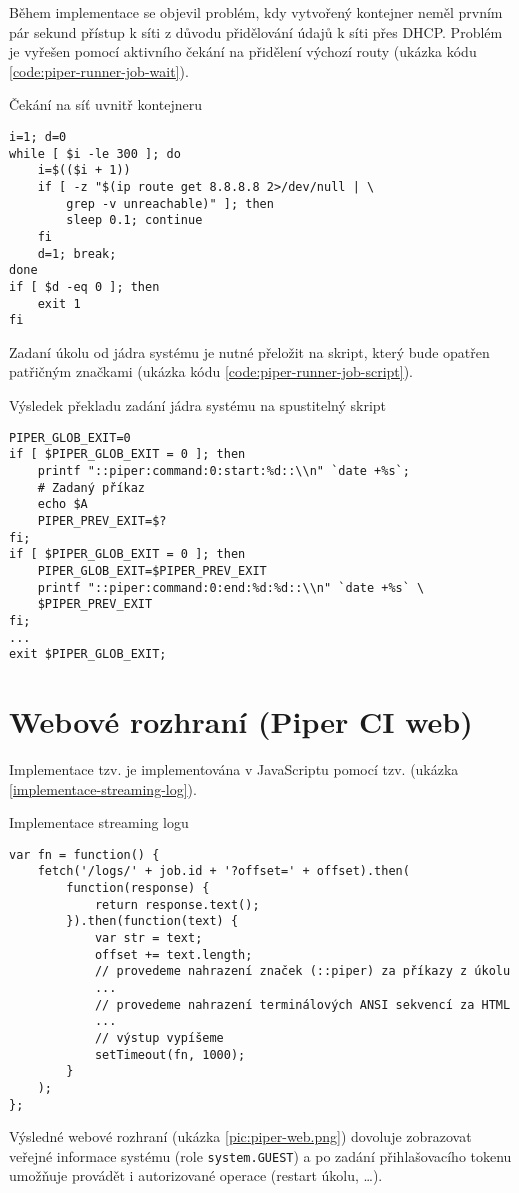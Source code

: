 Během implementace se objevil problém, kdy vytvořený kontejner neměl prvním pár sekund přístup k síti z důvodu přidělování údajů k síti přes DHCP.
Problém je vyřešen pomocí aktivního čekání na přidělení výchozí routy (ukázka kódu \ref{code:piper-runner-job-wait}).

\begin{listing}[ht]
\caption{\label{code:piper-runner-job-wait}Čekání na síť uvnitř kontejneru}
\begin{verbatim}
i=1; d=0
while [ $i -le 300 ]; do
    i=$(($i + 1))
    if [ -z "$(ip route get 8.8.8.8 2>/dev/null | \
        grep -v unreachable)" ]; then
        sleep 0.1; continue
    fi
    d=1; break;
done
if [ $d -eq 0 ]; then
    exit 1
fi
\end{verbatim}
\end{listing}

Zadaní úkolu od jádra systému je nutné přeložit na skript, který bude opatřen patřičným značkami (ukázka kódu \ref{code:piper-runner-job-script}).

\begin{listing}[ht]
\caption{\label{code:piper-runner-job-script}Výsledek překladu zadání jádra systému na spustitelný skript}
\begin{verbatim}
PIPER_GLOB_EXIT=0
if [ $PIPER_GLOB_EXIT = 0 ]; then
    printf "::piper:command:0:start:%d::\\n" `date +%s`;
    # Zadaný příkaz
    echo $A
    PIPER_PREV_EXIT=$?
fi;
if [ $PIPER_GLOB_EXIT = 0 ]; then
    PIPER_GLOB_EXIT=$PIPER_PREV_EXIT
    printf "::piper:command:0:end:%d:%d::\\n" `date +%s` \
    $PIPER_PREV_EXIT
fi;
...
exit $PIPER_GLOB_EXIT;
\end{verbatim}
\end{listing}

\section{Webové rozhraní (Piper CI web)}

Implementace tzv.  je implementována v JavaScriptu pomocí tzv.  (ukázka \ref{implementace-streaming-log}).

\begin{listing}[ht]
\caption{\label{implementace-streaming-log}Implementace streaming logu}
\begin{verbatim}
var fn = function() {
    fetch('/logs/' + job.id + '?offset=' + offset).then(
        function(response) {
            return response.text();
        }).then(function(text) {
            var str = text;
            offset += text.length;
            // provedeme nahrazení značek (::piper) za příkazy z úkolu
            ...
            // provedeme nahrazení terminálových ANSI sekvencí za HTML
            ...
            // výstup vypíšeme
            setTimeout(fn, 1000);
        }
    );
};
\end{verbatim}
\end{listing}

Výsledné webové rozhraní (ukázka \ref{pic:piper-web.png}) dovoluje zobrazovat veřejné informace systému (role \verb|system.GUEST|) a po zadání přihlašovacího tokenu umožňuje provádět i autorizované operace (restart úkolu, \ldots).


